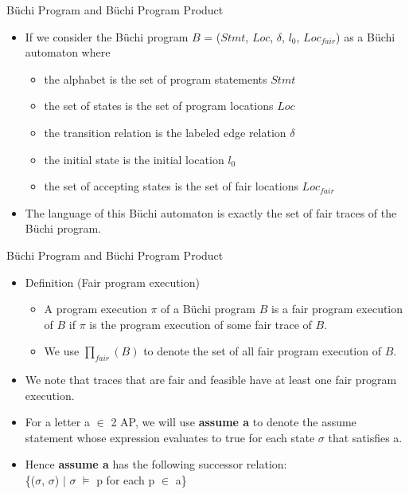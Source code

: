 \documentclass[12pt]{beamer}
\begin{document}
\begin{frame}{B\"uchi Program and B\"uchi Program Product}
  	\begin{itemize}
		\item If we consider the B\"uchi program $B$ = ($Stmt$, $Loc$, $\delta$, $l_{0}$, $Loc_{fair}$) as a B\"uchi automaton where
		\begin{itemize}
			\item the alphabet is the set of program statements $Stmt$
			\item the set of states is the set of program locations $Loc$
			\item the transition relation is the labeled edge relation $\delta$ 
			\item the initial state is the initial location $l_{0}$
			\item the set of accepting states is the set of fair locations $Loc_{fair}$
		\end{itemize}
		\item The language of this B\"uchi automaton is exactly the set of fair traces of the B\"uchi program.	
  	\end{itemize}
\end{frame}

\begin{frame}{B\"uchi Program and B\"uchi Program Product}
  	\begin{itemize}
		\item Definition (Fair program execution)
		\begin{itemize}
			\item A program execution $\pi$ of a B\"uchi program $B$ is a fair program execution of $B$ if $\pi$ is the program execution of some fair trace of $B$. 
			\item We use $\prod_{fair}(B)$ to denote the set of all fair program execution of $B$.
		\end{itemize}
		\item We note that traces that are fair and feasible have at least one fair program execution.
		\item For a letter a $\in$ 2 AP, we will use \textbf{assume a} to denote the assume statement whose expression evaluates to true for each state $\sigma$ that satisfies a. 
		\item Hence \textbf{assume a} has the following successor relation:\\ \{($\sigma$, $\sigma$\textquotesingle) $\mid$ $\sigma$ $\models$ p for each p $\in$ a\}
  	\end{itemize}
\end{frame}
\end{document}
